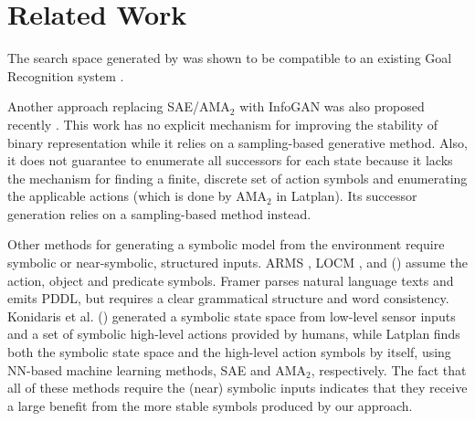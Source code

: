 \section{Related Work}

The search space generated by \latentplanner was shown to be compatible
to an existing Goal Recognition system \cite{amado2018goal,amado2018goalb}.

Another approach replacing SAE/AMA$_2$ with InfoGAN was also proposed recently \cite{kurutach2018learning}.
This work has no explicit mechanism for improving the stability of binary representation
while it relies on a sampling-based generative method.
Also, it does not guarantee to enumerate all successors for each state
because it lacks the mechanism for finding a finite, discrete set of action symbols
and enumerating the applicable actions (which is done by AMA$_2$ in Latplan).
Its successor generation relies on a sampling-based method instead.


Other methods for generating a symbolic model from the environment
require symbolic or near-symbolic, structured inputs. ARMS \cite{YangWJ07}, LOCM
\cite{CresswellMW13}, and \citeauthor{MouraoZPS12} (\citeyear{MouraoZPS12})
assume the action, object and predicate symbols.
% 
Framer \cite{lindsay2017framer} parses natural language texts and emits PDDL,
but requires a clear grammatical structure and word consistency. %
% 
Konidaris et al. (\citeyear{KonidarisKL18}) generated a symbolic state space from
low-level sensor inputs and a set of symbolic high-level actions provided by humans,
% 
while Latplan finds both the symbolic state space 
and the high-level action symbols by itself, using NN-based machine learning methods,
SAE and AMA$_2$, respectively.
% 
The fact that all of these methods require the (near) symbolic inputs indicates
that they receive a large benefit from the more stable symbols
produced by our approach.

% 

